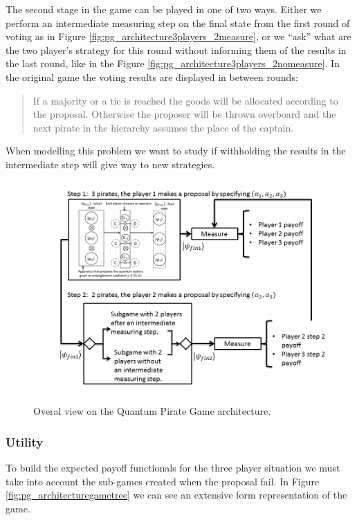 The second stage in the game can be played in one of two ways. Either we perform an intermediate measuring step on the final state from the first round of voting as in Figure \ref{fig:pg_architecture3players_2measure}, or we ``ask'' what are the two player's strategy for this round without informing them of the results in the last round, like in the Figure \ref{fig:pg_architecture3players_2nomeasure}. In the original game the voting results are displayed in between rounds:

\begin{quotation}
If a majority or a tie is reached the goods will be allocated according to the proposal. Otherwise the proposer will be thrown overboard and the next pirate in the hierarchy assumes the place of the captain. 
\end{quotation}

When modelling this problem we want to study if withholding the results in the intermediate step will give way to new strategies.

\begin{figure}[h]
\centering 
\includegraphics[scale=0.55]{Figures/architecture/esquema/Slide5.png}
\caption{Overal view on the Quantum Pirate Game architecture. }
\label{fig:pg_architecture3players_architecture}
\end{figure}

\subsubsection{Utility}
\label{subsec:pirates_utility}

To build the expected payoff functionals for the three player situation we must take into account the sub-games created when the proposal fail. In Figure \ref{fig:pg_architecturegametree} we can see an extensive form representation of the game.

